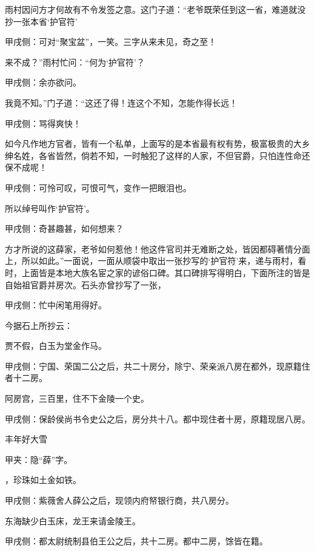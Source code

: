\begin{parag}
    雨村因问方才何故有不令发签之意。这门子道：“老爷既荣任到这一省，难道就没抄一张本省‘护官符’\begin{note}甲戌侧：可对“聚宝盆”，一笑。三字从来未见，奇之至！\end{note}来不成？”雨村忙问：“何为‘护官符’？\begin{note}甲戌侧：余亦欲问。\end{note}我竟不知。”门子道：“这还了得！连这个不知，怎能作得长远！\begin{note}甲戌侧：骂得爽快！\end{note}如今凡作地方官者，皆有一个私单，上面写的是本省最有权有势，极富极贵的大乡绅名姓，各省皆然，倘若不知，一时触犯了这样的人家，不但官爵，只怕连性命还保不成呢！\begin{note}甲戌侧：可怜可叹，可恨可气，变作一把眼泪也。\end{note}所以绰号叫作‘护官符’。\begin{note}甲戌侧：奇甚趣甚，如何想来？\end{note}方才所说的这薛家，老爷如何惹他！他这件官司并无难断之处，皆因都碍著情分面上，所以如此。”一面说，一面从顺袋中取出一张抄写的‘护官符’来，递与雨村，看时，上面皆是本地大族名宦之家的谚俗口碑。其口碑排写得明白，下面所注的皆是自始祖官爵并房次。石头亦曾抄写了一张，\begin{note}甲戌侧：忙中闲笔用得好。\end{note}今据石上所抄云：
\end{parag}


\begin{poem}
    \begin{pl}贾不假，白玉为堂金作马。\end{pl}
    \begin{note}甲戌侧：宁国、荣国二公之后，共二十房分，除宁、荣亲派八房在都外，现原籍住者十二房。\end{note}

    \begin{pl}阿房宫，三百里，住不下金陵一个史。\end{pl}
    \begin{note}甲戌侧：保龄侯尚书令史公之后，房分共十八。都中现住者十房，原籍现居八房。\end{note}

    \begin{pl}丰年好大雪\end{pl}\begin{note}甲夹：隐“薛”字。\end{note} \begin{pl}，珍珠如土金如铁。\end{pl}

    \begin{note}甲戌侧：紫薇舍人薛公之后，现领内府帑银行商，共八房分。\end{note}

    \begin{pl}东海缺少白玉床，龙王来请金陵王。\end{pl}\begin{note}甲戌侧：都太尉统制县伯王公之后，共十二房。都中二房，馀皆在籍。\end{note}

\end{poem}


